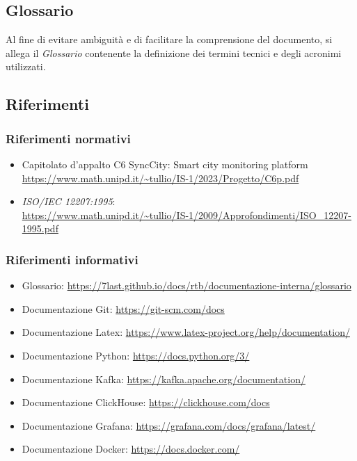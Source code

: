 \subsection{Glossario}
Al fine di evitare ambiguità e di facilitare la comprensione del documento, si allega il \textit{Glossario} contenente la definizione dei termini tecnici e degli acronimi utilizzati.

\subsection{Riferimenti}
\subsubsection{Riferimenti normativi}
\begin{itemize}
	\item Capitolato d'appalto C6 SyncCity: Smart city monitoring platform \\ \url{https://www.math.unipd.it/~tullio/IS-1/2023/Progetto/C6p.pdf}
	\item \textit{ISO/IEC 12207:1995}: \\ \url{https://www.math.unipd.it/~tullio/IS-1/2009/Approfondimenti/ISO_12207-1995.pdf}
	
\end{itemize}
\subsubsection{Riferimenti informativi}
\begin{itemize}
    \item Glossario: \url{https://7last.github.io/docs/rtb/documentazione-interna/glossario}
    \item Documentazione Git: \url{https://git-scm.com/docs}
    \item Documentazione Latex: \url{https://www.latex-project.org/help/documentation/}
    \item Documentazione Python: \url{https://docs.python.org/3/}
    \item Documentazione Kafka: \url{https://kafka.apache.org/documentation/}
    \item Documentazione ClickHouse: \url{https://clickhouse.com/docs}
    \item Documentazione Grafana: \url{https://grafana.com/docs/grafana/latest/}
    \item Documentazione Docker: \url{https://docs.docker.com/}
\end{itemize}